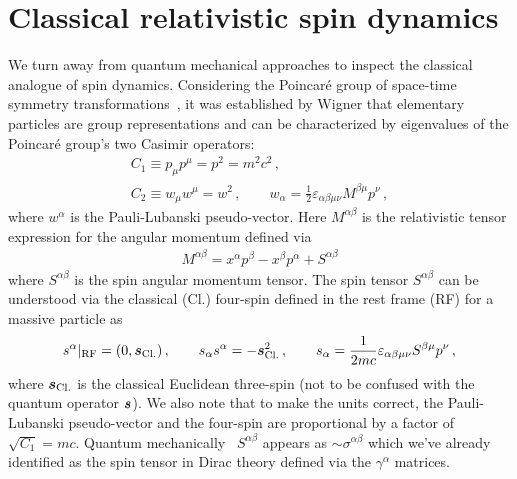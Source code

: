 \section{Classical relativistic spin dynamics}
\label{sec:cspin}
\noindent We turn away from quantum mechanical approaches to inspect the classical analogue of spin dynamics. Considering the Poincar{\'e} group of space-time symmetry
transformations~\citep{Weinberg:1995mt,greiner2012quantum}, it was established by Wigner that elementary particles are group representations and can be characterized by eigenvalues of the Poincar{\'e} group's two Casimir operators:
\begin{gather}
    C_{1}\equiv p_{\mu}p^{\mu} = p^{2} = m^{2}c^{2}\,,\\
    C_{2}\equiv w_{\mu}w^{\mu} = w^{2}\,,\qquad w_{\alpha}=\frac{1}{2}\varepsilon_{\alpha\beta\mu\nu}M^{\beta\mu}p^{\nu}\,,
\end{gather}
where $w^{\alpha}$ is the Pauli-Lubanski pseudo-vector. Here $M^{\alpha\beta}$ is the relativistic tensor expression for the angular momentum defined via
\begin{gather}
    M^{\alpha\beta} = x^{\alpha}p^{\beta}-x^{\beta}p^{\alpha} + S^{\alpha\beta}
\end{gather}
where $S^{\alpha\beta}$ is the spin angular momentum tensor. The spin tensor $S^{\alpha\beta}$ can be understood via the classical (Cl.) four-spin defined in the rest frame (RF) for a massive particle as
\begin{gather}
    s^{\alpha}\vert_\mathrm{RF} = (0,\boldsymbol{s}_\mathrm{Cl.})\,,\qquad s_{\alpha}s^{\alpha} = -\boldsymbol{s}_\mathrm{Cl.}^{2}\,,\qquad s_{\alpha} = \frac{1}{2mc}\varepsilon_{\alpha\beta\mu\nu}S^{\beta\mu}p^{\nu}\,,
\end{gather}
where $\boldsymbol{s}_\mathrm{Cl.}$ is the classical Euclidean three-spin (not to be confused with the quantum operator $\boldsymbol{s}$). We also note that to make the units correct, the Pauli-Lubanski pseudo-vector and the four-spin are proportional by a factor of $\sqrt{C_{1}}=mc$. Quantum mechanically~\citep{Ohlsson:2011zz} $S^{\alpha\beta}$ appears as $\sim\sigma^{\alpha\beta}$ which we've already identified as the spin tensor in Dirac theory defined via the $\gamma^{\alpha}$ matrices.

